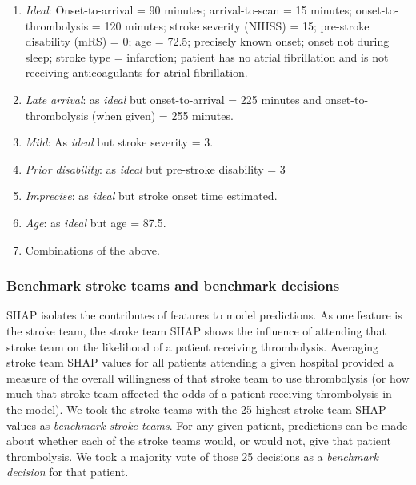 \begin{enumerate}
    \item \textit{Ideal}: Onset-to-arrival = 90 minutes; arrival-to-scan = 15 minutes; onset-to-thrombolysis = 120 minutes; stroke severity (NIHSS) = 15; pre-stroke disability (mRS) = 0; age = 72.5; precisely known onset; onset not during sleep; stroke type = infarction; patient has no atrial fibrillation and is not receiving anticoagulants for atrial fibrillation.

    \item \textit{Late arrival}: as \textit{ideal} but onset-to-arrival = 225 minutes and onset-to-thrombolysis (when given) = 255 minutes.

    \item \textit{Mild}: As \textit{ideal} but stroke severity = 3.

    \item \textit{Prior disability}: as \textit{ideal} but pre-stroke disability = 3

    \item \textit{Imprecise}: as \textit{ideal} but stroke onset time estimated.

    \item \textit{Age}: as \textit{ideal} but age = 87.5.

    \item Combinations of the above.
\end{enumerate}

\subsubsection{Benchmark stroke teams and benchmark decisions}

SHAP isolates the contributes of features to model predictions. As one feature is the stroke team, the stroke team SHAP shows the influence of attending that stroke team on the likelihood of a patient receiving thrombolysis. Averaging stroke team SHAP values for all patients attending a given hospital provided a measure of the overall willingness of that stroke team to use thrombolysis (or how much that stroke team affected the odds of a patient receiving thrombolysis in the model). We took the stroke teams with the 25 highest stroke team SHAP values as \textit{benchmark stroke teams}. For any given patient, predictions can be made about whether each of the stroke teams would, or would not, give that patient thrombolysis. We took a majority vote of those 25 decisions as a \textit{benchmark decision} for that patient.

